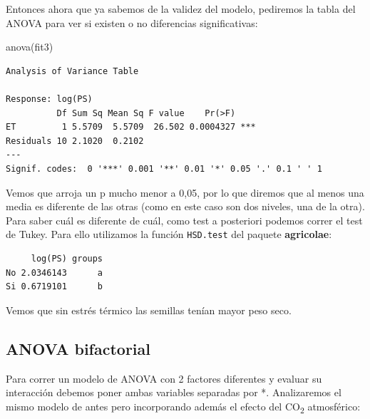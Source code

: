 \documentclass[
  letterpaper,
  DIV=11,
  numbers=noendperiod]{scrartcl}
\newenvironment{Shaded}{\begin{snugshade}}{\end{snugshade}}
\newcommand{\CommentTok}[1]{\textcolor[rgb]{0.37,0.37,0.37}{#1}}
\newcommand{\FunctionTok}[1]{\textcolor[rgb]{0.28,0.35,0.67}{#1}}
\newcommand{\NormalTok}[1]{\textcolor[rgb]{0.00,0.23,0.31}{#1}}
\newcommand{\OtherTok}[1]{\textcolor[rgb]{0.00,0.23,0.31}{#1}}
\newcommand{\SpecialCharTok}[1]{\textcolor[rgb]{0.37,0.37,0.37}{#1}}
\newcommand{\StringTok}[1]{\textcolor[rgb]{0.13,0.47,0.30}{#1}}
\begin{document}
Entonces ahora que ya sabemos de la validez del modelo, pediremos la
tabla del ANOVA para ver si existen o no diferencias significativas:

\begin{Shaded}
\begin{Highlighting}[]
\FunctionTok{anova}\NormalTok{(fit3)}
\end{Highlighting}
\end{Shaded}

\begin{verbatim}
Analysis of Variance Table

Response: log(PS)
          Df Sum Sq Mean Sq F value    Pr(>F)    
ET         1 5.5709  5.5709  26.502 0.0004327 ***
Residuals 10 2.1020  0.2102                      
---
Signif. codes:  0 '***' 0.001 '**' 0.01 '*' 0.05 '.' 0.1 ' ' 1
\end{verbatim}

Vemos que arroja un p mucho menor a 0,05, por lo que diremos que al
menos una media es diferente de las otras (como en este caso son dos
niveles, una de la otra). Para saber cuál es diferente de cuál, como
test a posteriori podemos correr el test de Tukey. Para ello utilizamos
la función \texttt{HSD.test} del paquete \textbf{agricolae}:

\begin{Shaded}
\end{Shaded}

\begin{verbatim}
     log(PS) groups
No 2.0346143      a
Si 0.6719101      b
\end{verbatim}

Vemos que sin estrés térmico las semillas tenían mayor peso seco.

\hypertarget{anova-bifactorial}{%
\subsection{ANOVA bifactorial}\label{anova-bifactorial}}

Para correr un modelo de ANOVA con 2 factores diferentes y evaluar su
interacción debemos poner ambas variables separadas por *. Analizaremos
el mismo modelo de antes pero incorporando además el efecto del
CO\textsubscript{2} atmosférico:
\end{document}
